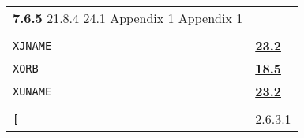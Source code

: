 \documentclass[a4paper,]{article}
\begin{document}
\begin{longtable}[]{@{}ll@{}}
\begin{minipage}[t]{0.70\columnwidth}
\textbf{\href{07-structured-objects.md\#765-uvector-the-primtype-1}{7.6.5}} \href{21-interrupts.md\#2184-gc}{21.8.4}
\href{24-efficiency-and-tastefulness.md\#241-efficiency}{24.1}
\href{appendix-1-a-look-inside.md\#appendix-1-a-look-inside}{Appendix 1}
\href{appendix-1-a-look-inside.md\#basic-data-structures}{Appendix 1}\strut
\end{minipage}\tabularnewline
\begin{minipage}[t]{0.24\columnwidth}\raggedright\strut
\strut
\end{minipage} & \begin{minipage}[t]{0.70\columnwidth}\raggedright\strut
\strut
\end{minipage}\tabularnewline
\begin{minipage}[t]{0.24\columnwidth}\raggedright\strut
\texttt{XJNAME}\strut
\end{minipage} & \begin{minipage}[t]{0.70\columnwidth}\raggedright\strut
\textbf{\href{23-mdl-as-a-system-process.md\#232-names}{23.2}}\strut
\end{minipage}\tabularnewline
\begin{minipage}[t]{0.24\columnwidth}\raggedright\strut
\texttt{XORB}\strut
\end{minipage} & \begin{minipage}[t]{0.70\columnwidth}\raggedright\strut
\textbf{\href{18-machine-words-and-bits.md\#185-bitwise-boolean-operations}{18.5}}\strut
\end{minipage}\tabularnewline
\begin{minipage}[t]{0.24\columnwidth}\raggedright\strut
\texttt{XUNAME}\strut
\end{minipage} & \begin{minipage}[t]{0.70\columnwidth}\raggedright\strut
\textbf{\href{23-mdl-as-a-system-process.md\#232-names}{23.2}}\strut
\end{minipage}\tabularnewline
\begin{minipage}[t]{0.24\columnwidth}\raggedright\strut
\strut
\end{minipage} & \begin{minipage}[t]{0.70\columnwidth}\raggedright\strut
\strut
\end{minipage}\tabularnewline
\begin{minipage}[t]{0.24\columnwidth}\raggedright\strut
\texttt{{[}}\strut
\end{minipage} & \begin{minipage}[t]{0.70\columnwidth}\raggedright\strut
\href{02-read-evaluate-print.md\#2631-non-pnames}{2.6.3.1}

\end{minipage}
\end{longtable}
\end{document}
